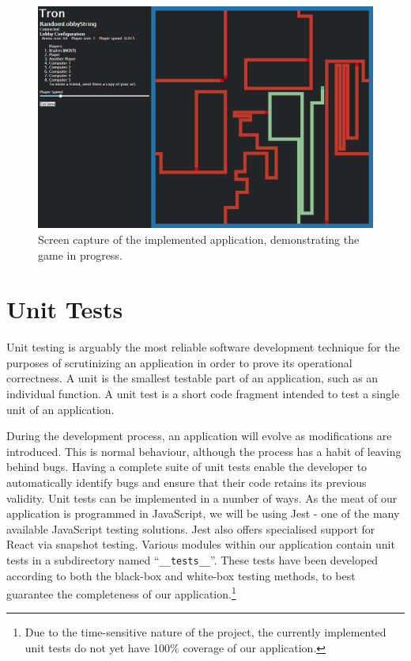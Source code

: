 \documentclass{standalone}
\begin{document}
	\begin{figure}[!htbp]
		\centering
		\includegraphics[width=\textwidth]{resources/images/ingame.png}
		\caption{Screen capture of the implemented application, demonstrating the game in progress.}
	\end{figure}
	\FloatBarrier

	\section{Unit Tests}
		Unit testing is arguably the most reliable software development technique for the purposes of scrutinizing an application in order to prove its operational correctness. A unit is the smallest testable part of an application, such as an individual function. A unit test is a short code fragment intended to test a single unit of an application.

		During the development process, an application will evolve as modifications are introduced. This is normal behaviour, although the process has a habit of leaving behind bugs. Having a complete suite of unit tests enable the developer to automatically identify bugs and ensure that their code retains its previous validity. Unit tests can be implemented in a number of ways. As the meat of our application is programmed in JavaScript, we will be using Jest \parencite{jest} - one of the many available JavaScript testing solutions. Jest also offers specialised support for React via snapshot testing. Various modules within our application contain unit tests in a subdirectory named \enquote{\texttt{\_\_tests\_\_}}. These tests have been developed according to both the black-box and white-box testing methods, to best guarantee the completeness of our application.\footnote{Due to the time-sensitive nature of the project, the currently implemented unit tests do not yet have 100\% coverage of our application.}
\end{document}
